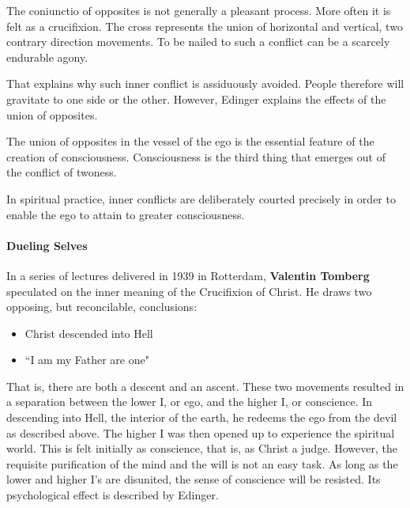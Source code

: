 \begin{quotex}
The coniunctio of opposites is not generally a pleasant process. More often it is felt as a crucifixion. The cross represents the union of horizontal and vertical, two contrary direction movements. To be nailed to such a conflict can be a scarcely endurable agony. 

\end{quotex}
That explains why such inner conflict is assiduously avoided. People therefore will gravitate to one side or the other. However, Edinger explains the effects of the union of opposites.

\begin{quotex}
The union of opposites in the vessel of the ego is the essential feature of the creation of consciousness. Consciousness is the third thing that emerges out of the conflict of twoness. 

\end{quotex}
In spiritual practice, inner conflicts are deliberately courted precisely in order to enable the ego to attain to greater consciousness.

\paragraph{Dueling Selves}
In a series of lectures delivered in 1939 in Rotterdam, \textbf{Valentin Tomberg} speculated on the inner meaning of the Crucifixion of Christ. He draws two opposing, but reconcilable, conclusions:

\begin{itemize}
\item Christ descended into Hell 
\item ``I am my Father are one" 
\end{itemize}
That is, there are both a descent and an ascent. These two movements resulted in a separation between the lower I, or ego, and the higher I, or conscience. In descending into Hell, the interior of the earth, he redeems the ego from the devil as described above. The higher I was then opened up to experience the spiritual world. This is felt initially as conscience, that is, as Christ a judge. However, the requisite purification of the mind and the will is not an easy task. As long as the lower and higher I's are disunited, the sense of conscience will be resisted. Its psychological effect is described by Edinger.

